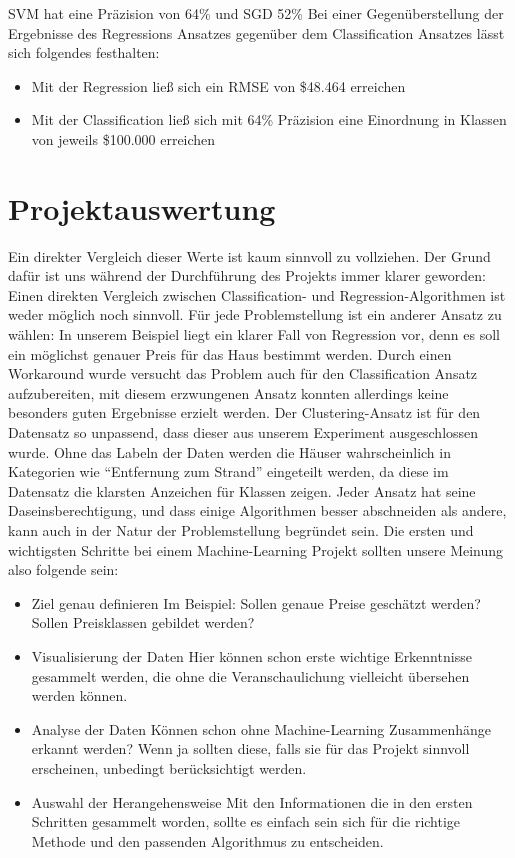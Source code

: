 SVM hat eine Präzision von 64\% und SGD 52\%
\newline
\newline
Bei einer Gegenüberstellung der Ergebnisse des Regressions Ansatzes gegenüber dem Classification Ansatzes lässt sich folgendes festhalten:
\begin{itemize}
\item Mit der Regression ließ sich ein RMSE von \$48.464 erreichen
\item Mit der Classification ließ sich mit 64\% Präzision eine Einordnung in Klassen von jeweils \$100.000 erreichen
\end{itemize}

\section{Projektauswertung}
\label{projektauswertung}
Ein direkter Vergleich dieser Werte ist kaum sinnvoll zu vollziehen.
Der Grund dafür ist uns während der Durchführung des Projekts immer klarer geworden:
Einen direkten Vergleich zwischen Classification- und Regression-Algorithmen ist weder möglich noch sinnvoll. Für jede Problemstellung ist ein anderer Ansatz zu wählen: 
In unserem Beispiel liegt ein klarer Fall von Regression vor, denn es soll ein möglichst genauer Preis für das Haus bestimmt werden. Durch einen Workaround wurde versucht das Problem auch für den Classification Ansatz aufzubereiten, mit diesem erzwungenen Ansatz konnten allerdings keine besonders guten Ergebnisse erzielt werden. Der Clustering-Ansatz ist für den Datensatz so unpassend, dass dieser aus unserem Experiment ausgeschlossen wurde. Ohne das Labeln der Daten werden die Häuser wahrscheinlich in Kategorien wie “Entfernung zum Strand” eingeteilt werden, da diese im Datensatz die klarsten Anzeichen für Klassen zeigen. 
\newline
\newline
Jeder Ansatz hat seine Daseinsberechtigung, und dass einige Algorithmen besser abschneiden als andere, kann auch in der Natur der Problemstellung begründet sein. 
Die ersten und wichtigsten Schritte bei einem Machine-Learning Projekt sollten unsere Meinung also folgende sein:
\begin{itemize}
\item Ziel genau definieren \newline
Im Beispiel: Sollen genaue Preise geschätzt werden? Sollen Preisklassen gebildet werden?
\item Visualisierung der Daten \newline
Hier können schon erste wichtige Erkenntnisse gesammelt werden, die ohne die Veranschaulichung vielleicht übersehen werden können.
\item Analyse der Daten \newline
Können schon ohne Machine-Learning Zusammenhänge erkannt werden? 
Wenn ja sollten diese, falls sie für das Projekt sinnvoll erscheinen, unbedingt berücksichtigt werden.
\item Auswahl der Herangehensweise \newline
Mit den Informationen die in den ersten Schritten gesammelt worden, sollte es einfach sein sich für die richtige Methode und den passenden Algorithmus zu entscheiden.
\end{itemize}
